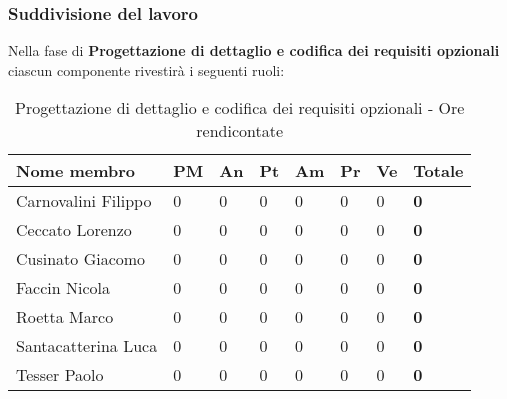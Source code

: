 		\subsubsection{Suddivisione del lavoro} %
		\label{ssub:suddivisione_del_lavoro}
		Nella fase di \textbf{Progettazione di dettaglio e codifica dei requisiti opzionali} ciascun componente rivestirà i seguenti ruoli: \\
			\begin{table}[!h]
				\begin{center}
					\begin{tabularx}{0.9\textwidth}{|l|l|l|l|l|l|l|X|}
						\hline
						\textbf{Nome membro} & \textbf{PM} & \textbf{An} & \textbf{Pt} & \textbf{Am} & \textbf{Pr} & \textbf{Ve} & \textbf{Totale} \\
						\hline
						Carnovalini Filippo & 0 & 0 & 0 & 0 & 0 & 0 & \textbf{0} \\
						\hline
						Ceccato Lorenzo & 0 & 0 & 0 & 0 & 0 & 0 & \textbf{0} \\
						\hline
						Cusinato Giacomo & 0 & 0 & 0 & 0 & 0 & 0 & \textbf{0} \\
						\hline
						Faccin Nicola & 0 & 0 & 0 & 0 & 0 & 0 & \textbf{0} \\
						\hline
						Roetta Marco & 0 & 0 & 0 & 0 & 0 & 0 & \textbf{0} \\
						\hline
						Santacatterina Luca & 0 & 0 & 0 & 0 & 0 & 0 & \textbf{0} \\
						\hline
						Tesser Paolo & 0 & 0 & 0 & 0 & 0 & 0 & \textbf{0} \\
						\hline		
					\end{tabularx}
				\end{center}
			\caption{Progettazione di dettaglio e codifica dei requisiti opzionali - Ore rendicontate}
			\end{table}
			
		
